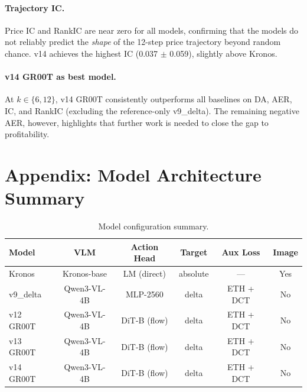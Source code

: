 \documentclass[11pt,a4paper]{article}
\begin{document}
\paragraph{Trajectory IC.}
Price IC and RankIC are near zero for all models, confirming that the models do not reliably
predict the \emph{shape} of the 12-step price trajectory beyond random chance.
v14 achieves the highest IC (0.037 $\pm$ 0.059), slightly above Kronos.

\paragraph{v14 GR00T as best model.}
At $k \in \{6, 12\}$, v14 GR00T consistently outperforms all baselines on DA, AER, IC, and RankIC
(excluding the reference-only v9\_delta).
The remaining negative AER, however, highlights that further work is needed to close the gap
to profitability.

\section*{Appendix: Model Architecture Summary}

\begin{table}[h]
\centering
\caption{Model configuration summary.}
\renewcommand{\arraystretch}{1.2}
\begin{tabular}{lccccc}
\toprule
\textbf{Model} & \textbf{VLM} & \textbf{Action Head} & \textbf{Target} & \textbf{Aux Loss} & \textbf{Image} \\
\midrule
Kronos        & Kronos-base & LM (direct)   & absolute  & ---       & Yes \\
v9\_delta     & Qwen3-VL-4B & MLP-2560      & delta     & ETH + DCT & No  \\
v12 GR00T     & Qwen3-VL-4B & DiT-B (flow)  & delta     & ETH + DCT & No  \\
v13 GR00T     & Qwen3-VL-4B & DiT-B (flow)  & delta     & ETH + DCT & No  \\
v14 GR00T     & Qwen3-VL-4B & DiT-B (flow)  & delta     & ETH + DCT & No  \\
\bottomrule
\end{tabular}
\end{table}
\end{document}
